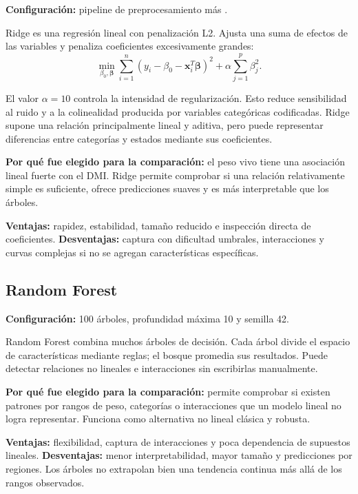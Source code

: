 \documentclass[11pt,a4paper]{article}
\newcommand{\codigo}[1]{\texttt{\detokenize{#1}}}
\begin{document}
\textbf{Configuración:} pipeline de preprocesamiento más \codigo{Ridge(alpha=10.0)}.

Ridge es una regresión lineal con penalización L2. Ajusta una suma de efectos de las variables y penaliza coeficientes excesivamente grandes:
\begin{equation}
\min_{\beta_0,\boldsymbol{\beta}}\sum_{i=1}^{n}(y_i-\beta_0-\mathbf{x}_i^T\boldsymbol{\beta})^2+\alpha\sum_{j=1}^{p}\beta_j^2.
\end{equation}

El valor $\alpha=10$ controla la intensidad de regularización. Esto reduce sensibilidad al ruido y a la colinealidad producida por variables categóricas codificadas. Ridge supone una relación principalmente lineal y aditiva, pero puede representar diferencias entre categorías y estados mediante sus coeficientes.

\textbf{Por qué fue elegido para la comparación:} el peso vivo tiene una asociación lineal fuerte con el DMI. Ridge permite comprobar si una relación relativamente simple es suficiente, ofrece predicciones suaves y es más interpretable que los árboles.

\textbf{Ventajas:} rapidez, estabilidad, tamaño reducido e inspección directa de coeficientes. \textbf{Desventajas:} captura con dificultad umbrales, interacciones y curvas complejas si no se agregan características específicas.

\subsection{Random Forest}

\textbf{Configuración:} 100 árboles, profundidad máxima 10 y semilla 42.

Random Forest combina muchos árboles de decisión. Cada árbol divide el espacio de características mediante reglas; el bosque promedia sus resultados. Puede detectar relaciones no lineales e interacciones sin escribirlas manualmente.

\textbf{Por qué fue elegido para la comparación:} permite comprobar si existen patrones por rangos de peso, categorías o interacciones que un modelo lineal no logra representar. Funciona como alternativa no lineal clásica y robusta.

\textbf{Ventajas:} flexibilidad, captura de interacciones y poca dependencia de supuestos lineales. \textbf{Desventajas:} menor interpretabilidad, mayor tamaño y predicciones por regiones. Los árboles no extrapolan bien una tendencia continua más allá de los rangos observados.
\end{document}
